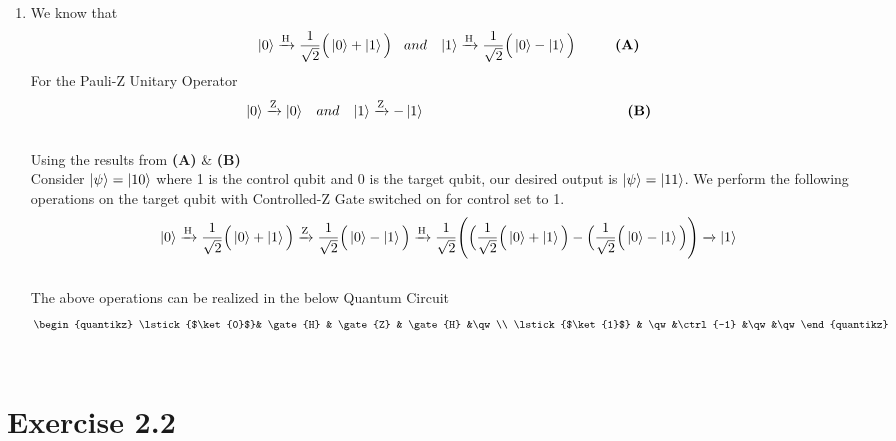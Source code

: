\documentclass[a4paper,12pt]{article}
\begin{document}
\begin{enumerate}[label=(\alph*)]
    \item
          We know that \[\ket{0} \xrightarrow{\text{H}} \frac{1}{\sqrt{2}}\Big(\ket{0}+\ket{1}\Big) \hspace{3mm}and\hspace{3mm}\ket{1} \xrightarrow{\text{H}} \frac{1}{\sqrt{2}}\Big(\ket{0}-\ket{1}\Big) \hspace{10mm} \textbf{(A)}\]
          For the Pauli-Z Unitary Operator \[\ket{0}\xrightarrow{\text{Z}}\ket{0}\hspace{3mm} and\hspace{3mm} \ket{1}\xrightarrow{\text{Z}}-\ket{1} \hspace{51mm} \textbf{(B)}\] \\
          Using the results from \textbf{(A)} \& \textbf{(B)} \\ \linebreak
          Consider $\ket{\psi} = \ket{10}$ where 1 is the control qubit and 0 is the target qubit, our desired output is $\ket{\psi} = \ket{11}$.
          We perform the following operations on the target qubit with Controlled-Z Gate switched on for control set to 1. \\ \linebreak
          \[\ket{0} \xrightarrow{\text{H}} \frac{1}{\sqrt{2}}\Big(\ket{0}+\ket{1}\Big) \xrightarrow{\text{Z}}\frac{1}{\sqrt{2}}\Big(\ket{0}-\ket{1}\Big) \xrightarrow{\text{H}} \frac{1}{\sqrt{2}} \Bigg(\Big(\frac{1}{\sqrt{2}}\Big(\ket{0}+\ket{1}\Big) - \Big(\frac{1}{\sqrt{2}}\Big(\ket{0}-\ket{1}\Big)\Bigg) \xrightarrow{} \ket{1}\] \\ \linebreak
          The above operations can be realized in the below Quantum Circuit \\ \linebreak
          \[\begin{quantikz}
                  \lstick{$\ket{0}$}& \gate{H} & \gate{Z} & \gate{H} &\qw \\
                  \lstick{$\ket{1}$} & \qw      &\ctrl{-1}   &\qw &\qw
              \end{quantikz}\]
          \\ \linebreak

\end{enumerate}
\section*{Exercise 2.2}
\end{document}
